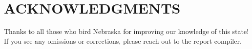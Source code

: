\documentclass[OA]{fieldreport}
\begin{document}
	\section*{ACKNOWLEDGMENTS}
	
	Thanks to all those who bird Nebraska for improving our knowledge of this state! If you see any omissions or corrections, please reach out to the report compiler.
	
	
	
\end{document}
